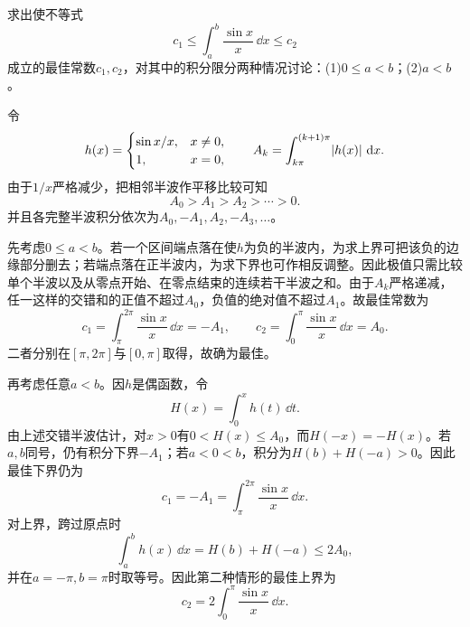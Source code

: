 \begin{xreferenceproblem}[5]
求出使不等式
  \[
    c_1\le\int_a^b\frac{\sin x}{x}\,\dd x\le c_2
  \]
  成立的最佳常数$c_1,c_2$，对其中的积分限分两种情况讨论：(1)$0\le a<b$；(2)$a<b$。
\end{xreferenceproblem}
\begin{xsolution}
令
\[
 h(x)=\begin{cases}\sin x/x,&x\ne0,\\1,&x=0,\end{cases}
\qquad
 A_k=\int_{k\pi}^{(k+1)\pi}\lvert h(x)\rvert\,\mathop{}\!\mathrm{d} x.
\]
由于$1/x$严格减少，把相邻半波作平移比较可知
\[
 A_0>A_1>A_2>\cdots>0.
\]
并且各完整半波积分依次为$A_0,-A_1,A_2,-A_3,\ldots$。

先考虑$0\le a<b$。若一个区间端点落在使$h$为负的半波内，为求上界可把该负的边缘部分删去；若端点落在正半波内，为求下界也可作相反调整。因此极值只需比较单个半波以及从零点开始、在零点结束的连续若干半波之和。由于$A_k$严格递减，任一这样的交错和的正值不超过$A_0$，负值的绝对值不超过$A_1$。故最佳常数为
\[
 \boxed{c_1=\int_\pi^{2\pi}\frac{\sin x}{x}\,\dd x=-A_1},
 \qquad
 \boxed{c_2=\int_0^\pi\frac{\sin x}{x}\,\dd x=A_0}.
\]
二者分别在$[\pi,2\pi]$与$[0,\pi]$取得，故确为最佳。

再考虑任意$a<b$。因$h$是偶函数，令
\[
 H(x)=\int_0^xh(t)\,\dd t.
\]
由上述交错半波估计，对$x>0$有$0<H(x)\le A_0$，而$H(-x)=-H(x)$。若$a,b$同号，仍有积分下界$-A_1$；若$a<0<b$，积分为$H(b)+H(-a)>0$。因此最佳下界仍为
\[
 \boxed{c_1=-A_1=\int_\pi^{2\pi}\frac{\sin x}{x}\,\dd x}.
\]
对上界，跨过原点时
\[
 \int_a^bh(x)\,\dd x=H(b)+H(-a)\le2A_0,
\]
并在$a=-\pi,b=\pi$时取等号。因此第二种情形的最佳上界为
\[
 \boxed{c_2=2\int_0^\pi\frac{\sin x}{x}\,\dd x}.
\]
\end{xsolution}


